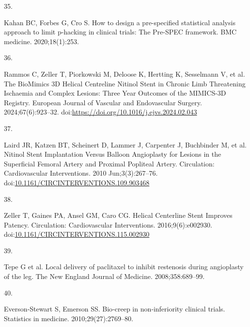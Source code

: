 \documentclass{article}
\newlength{\cslhangindent}
\newlength{\csllabelwidth}
\newenvironment{CSLReferences}[2] %
 {\begin{list}{}{%
  \setlength{\itemindent}{0pt}
  \setlength{\leftmargin}{0pt}
  \setlength{\parsep}{0pt}
  \ifodd #1
   \setlength{\leftmargin}{\cslhangindent}
   \setlength{\itemindent}{-1\cslhangindent}
  \fi
  \setlength{\itemsep}{#2\baselineskip}}}
 {\end{list}}
\newcommand{\CSLLeftMargin}[1]{\parbox[t]{\csllabelwidth}{#1}}
\newcommand{\CSLRightInline}[1]{\parbox[t]{\linewidth - \csllabelwidth}{#1}\break}
\begin{document}
\begin{CSLReferences}{0}{1}
\CSLLeftMargin{35. }%
\CSLRightInline{Kahan BC, Forbes G, Cro S. How to design a pre-specified
statistical analysis approach to limit p-hacking in clinical trials: The
{Pre}-{SPEC} framework. BMC medicine. 2020;18(1):253.}

\CSLLeftMargin{36. }%
\CSLRightInline{Rammos C, Zeller T, Piorkowski M, Deloose K, Hertting K,
Sesselmann V, et al. The {BioMimics} {3D} {Helical} {Centreline}
{Nitinol} {Stent} in {Chronic} {Limb} {Threatening} {Ischaemia} and
{Complex} {Lesions}: {Three} {Year} {Outcomes} of the {MIMICS}-{3D}
{Registry}. European Journal of Vascular and Endovascular Surgery.
2024;67(6):923--32.
doi:\url{https://doi.org/10.1016/j.ejvs.2024.02.043}}

\CSLLeftMargin{37. }%
\CSLRightInline{{Laird JR, Katzen BT, Scheinert D, Lammer J, Carpenter
J, Buchbinder M, et al.} Nitinol {Stent} {Implantation} {Versus}
{Balloon} {Angioplasty} for {Lesions} in the {Superficial} {Femoral}
{Artery} and {Proximal} {Popliteal} {Artery}. Circulation:
Cardiovascular Interventions. 2010 Jun;3(3):267--76.
doi:\href{https://doi.org/10.1161/CIRCINTERVENTIONS.109.903468}{10.1161/CIRCINTERVENTIONS.109.903468}}

\CSLLeftMargin{38. }%
\CSLRightInline{Zeller T, Gaines PA, Ansel GM, Caro CG. Helical
{Centerline} {Stent} {Improves} {Patency}. Circulation: Cardiovascular
Interventions. 2016;9(6):e002930.
doi:\href{https://doi.org/10.1161/CIRCINTERVENTIONS.115.002930}{10.1161/CIRCINTERVENTIONS.115.002930}}

\CSLLeftMargin{39. }%
\CSLRightInline{{Tepe G et al.} Local delivery of paclitaxel to inhibit
restenosis during angioplasty of the leg. The New England Journal of
Medicine. 2008;358:689--99.}

\CSLLeftMargin{40. }%
\CSLRightInline{Everson‐Stewart S, Emerson SS. Bio‐creep in
non‐inferiority clinical trials. Statistics in medicine.
2010;29(27):2769--80.}

\end{CSLReferences}



\end{document}
